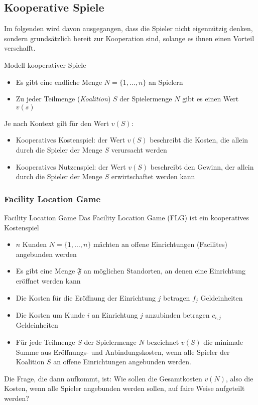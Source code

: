 \documentclass{panikzettel}
\begin{document}

\subsection{Kooperative Spiele}
Im folgenden wird davon ausgegangen, dass die Spieler nicht eigennützig denken, sondern grundsätzlich bereit zur Kooperation sind, solange es ihnen einen Vorteil verschafft.

\begin{defi}{Modell kooperativer Spiele}
	\begin{itemize} 
	\item Es gibt eine endliche Menge $N = \{1, \dots , n\}$ an Spielern
	\item Zu jeder Teilmenge (\emph{Koalition}) $S$ der Spielermenge $N$ gibt es einen Wert $v(s)$
	\end{itemize}

	Je nach Kontext gilt für den Wert $v(S)$:
	
	\begin{itemize}
		\item Kooperatives Kostenspiel: der Wert $v(S)$ beschreibt die Kosten, die allein durch die Spieler der Menge $S$ verursacht werden
		\item Kooperatives Nutzenspiel: der Wert $v(S)$ beschreibt den Gewinn, der allein durch die Spieler der Menge $S$ erwirtschaftet werden kann
	\end{itemize}
\end{defi}

\subsubsection{Facility Location Game}

\begin{defi}{Facility Location Game}
	Das Facility Location Game (FLG) ist ein kooperatives Kostenspiel
	
	\begin{itemize}
		\item $n$ Kunden $N = \{1, \dots, n\}$ mächten an offene Einrichtungen (Facilites) angebunden werden
		\item Es gibt eine Menge $\mathfrak{F}$ an möglichen Standorten, an denen eine Einrichtung eröffnet werden kann
		\item Die Kosten für die Eröffnung der Einrichtung $j$ betragen $f_j$ Geldeinheiten
		\item Die Kosten um Kunde $i$ an Einrichtung $j$ anzubinden betragen $c_{i,j}$ Geldeinheiten
		\item Für jede Teilmenge $S$ der Spielermenge $N$ bezeichnet $v(S)$ die minimale Summe aus Eröffnungs- und Anbindungskosten, wenn alle Spieler der Koalition $S$ an offene Einrichtungen angebunden werden.
	\end{itemize} 

	Die Frage, die dann aufkommt, ist: Wie sollen die Gesamtkosten $v(N)$, also die Kosten, wenn alle Spieler angebunden werden sollen, auf faire Weise aufgeteilt werden?
\end{defi}
\end{document}
